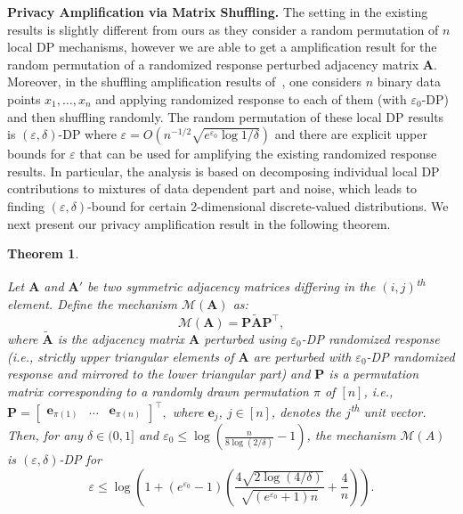 \documentclass[11pt]{article}
\theoremstyle{plain}
\newtheorem{theorem}{Theorem}[section]
\theoremstyle{definition}
\theoremstyle{remark}
\newcommand{\veps}{{\varepsilon}}
\begin{document}
\noindent \textbf{Privacy Amplification via Matrix Shuffling.} The setting in the existing results is slightly different from ours as they consider a random permutation of $n$ local DP mechanisms, however we are able to get a amplification result for the random permutation of a randomized response perturbed adjacency matrix $\mathbf{A}$. Moreover, in the shuffling amplification results of~\citep{feldman2022hiding}, one considers  $n$ binary data points $x_1, \ldots, x_n$ and applying randomized response to each of them (with $\veps_0$-DP) and then shuffling randomly. The random permutation of these local DP results is $(\veps,\delta)$-DP where
$
\veps = O( n^{-1/2} \sqrt{e^{\veps_0} \log 1/\delta} )
$
and there are explicit upper bounds for $\veps$ that can be used for amplifying the existing randomized response results. 
In particular, the analysis is based on decomposing individual local DP contributions to mixtures of data dependent part and noise, which leads to finding $(\veps,\delta)$-bound for certain 2-dimensional discrete-valued distributions. We next present our privacy amplification result in the following theorem.

\begin{theorem} \label{thm:shuffling_bound}
    
Let $\mathbf{A}$ and $\mathbf{A}'$ be two symmetric adjacency matrices differing in the $(i,j)$\textsuperscript{th} element.
Define the mechanism $\mathcal{M}(\mathbf{A})$ as: 
$$
\mathcal{M}(\mathbf{A}) = \mathbf{P}\widetilde{\mathbf{A}}\mathbf{P}^{\top},
$$
where $\widetilde{\mathbf{A}}$ is the adjacency matrix $\mathbf{A}$ perturbed using $\veps_0$-DP randomized response (i.e., strictly upper triangular elements of $\mathbf{A}$ are perturbed with $\veps_0$-DP randomized response and mirrored to the lower triangular part) and $\mathbf{P}$ is a permutation matrix corresponding to a randomly drawn permutation $\pi$ of $[n]$, i.e.,  
$
\mathbf{P} = \begin{bmatrix}
    \mathbf{e}_{\pi(1)} & \ldots & \mathbf{e}_{\pi(n)}
\end{bmatrix}^{\top},
$
where $\mathbf{e}_j$, $j \in [n]$, denotes the $j$\textsuperscript{th} unit vector.
Then, for any $\delta \in (0,1]$ and $\veps_0 \leq \log \left( \frac{n}{8 \log(2 / \delta)} - 1 \right)$, the mechanism $\mathcal{M}(A)$ is $(\veps,\delta)$-DP for 
\begin{equation} \label{eq:ineq_hockey_stick_shuffling}
\veps \leq \log \left( 1 + (e^{\veps_0} - 1) \left( \frac{4 \sqrt{2\log(4/\delta)}}{\sqrt{(e^{\veps_0}+1)n}} + \frac{4}{n} \right) \right).
\end{equation}
\end{theorem}
\end{document}
